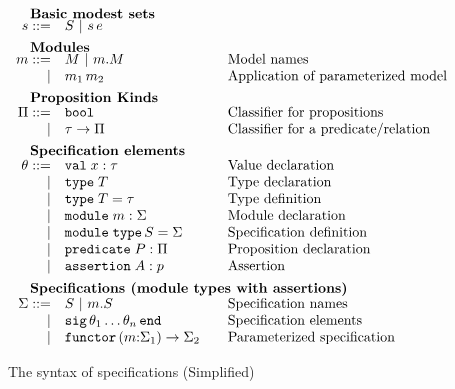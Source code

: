 \begin{figure}
\[\begin{array}{rl@{\qquad}l}
    \noalign{\textbf{Basic modest sets}}
    \os ::=
    & \oS \obar \oapp{\os}{\oe} & \\[5pt]

    \noalign{\textbf{Modules}}		
    \om ::= 
    & \oM  \obar \oselect{\om}{\oM}&\mbox{Model names}\\
    | & \oapp{\om_1}{\om_2}&\mbox{Application of parameterized model}\\[5pt]
    
    \noalign{\textbf{Proposition Kinds}}
    \opt ::=
    & \oProp & \mbox{Classifier for propositions}\\
    |& \oarrow{\oty}{\opt} & \mbox{Classifier for a predicate/relation}\\[5pt] 
    
    \noalign{\textbf{Specification elements}}
    \ote ::=
    & \ovalspec{\ox}{\oty}&\mbox{Value declaration}\\
    | & \otyspec{\oTY}&\mbox{Type declaration}\\
    | & \otydef{\oTY}{\oty}&\mbox{Type definition}\\
    | & \omodulespec{\om}{\omt}&\mbox{Module declaration}\\
    | & \osignatdef{\oMT}{\omt}&\mbox{Specification definition}\\
    | & \opropspec{\oP}{\opt}&\mbox{Proposition declaration}\\
    | & \oassertion{\oA}{\op}&\mbox{Assertion}\\[5pt]

    \noalign{\textbf{Specifications (module types with assertions)}}
    \omt ::= 
    & \oMT \obar \oselect{\om}{\oMT} & \mbox{Specification names}\\
    | & \osig{\ote_1 \ldots \ote_n} & \mbox{Specification elements}\\
    | & \ofunctor{\om}{\omt_1}{\omt_2} & \mbox{Parameterized specification}\\
  \end{array}
  \]
  \label{fig:output}
  \caption{The syntax of specifications (Simplified)}
\end{figure}
\fi %

